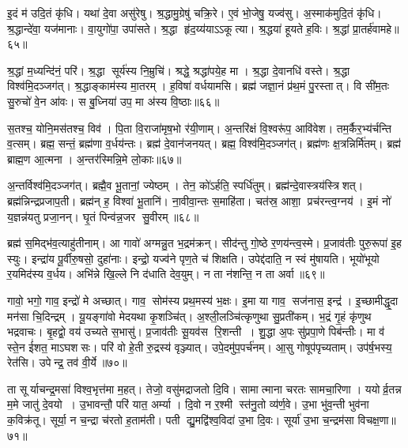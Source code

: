 इ॒दं म॑ उदि॒तं कृ॑धि।
यथा॑ दे॒वा असु॑रेषु।
श्र॒द्धामु॒ग्रेषु॑ चक्रि॒रे।
ए॒वं भो॒जेषु॒ यज्व॑सु।
अ॒स्माक॑मुदि॒तं कृ॑धि।
श्र॒द्धान्दे॑वा॒ यज॑मानाः।
वा॒युगो॑पा॒ उपा॑सते।
श्र॒द्धा हृ॑द॒य्य॑याऽऽकूत्या।
श्र॒द्धया॑ हूयते ह॒विः।
श्र॒द्धां प्रा॒तर्\mbox{}ह॑वामहे॥६५॥

श्र॒द्धां म॒ध्यन्दि॑नं॒ परि॑।
श्र॒द्धा सूर्य॑स्य नि॒म्रुचि॑।
श्रद्धे॒ श्रद्धा॑पये॒ह मा।
श्र॒द्धा दे॒वानधि॑ वस्ते।
श्र॒द्धा विश्व॑मि॒दञ्जग॑त्।
श्र॒द्धाङ्काम॑स्य मा॒तरम्।
ह॒विषा॑ वर्धयामसि।
ब्रह्म॑ जज्ञा॒नं प्र॑थ॒मं पु॒रस्तात्।
वि सी॑म॒तः सु॒रुचो॑ वे॒न आ॑वः।
स बु॒ध्निया॑ उप॒ मा अ॑स्य वि॒ष्ठाः॥६६॥

स॒तश्च॒ योनि॒मस॑तश्च॒ विव॑।
पि॒ता वि॒राजा॑मृष॒भो र॑यी॒णाम्।
अ॒न्तरि॑क्षं वि॒श्वरू॑प॒ आवि॑वेश।
तम॒र्कैर॒भ्य॑र्चन्ति व॒त्सम्।
ब्रह्म॒ सन्तं॒ ब्रह्म॑णा व॒र्धय॑न्तः।
ब्रह्म॑ दे॒वान॑जनयत्।
ब्रह्म॒ विश्व॑मि॒दञ्जग॑त्।
ब्रह्म॑णः क्ष॒त्रन्निर्मि॑तम्।
ब्रह्म॑ ब्राह्म॒ण आ॒त्मना।
अ॒न्तर॑स्मिन्नि॒मे लो॒काः॥६७॥

अ॒न्तर्विश्व॑मि॒दञ्जग॑त्।
ब्रह्मै॒व भू॒तानां॒ ज्येष्ठम्।
तेन॒ को॑ऽर्\mbox{}हति॒ स्पर्धि॑तुम्।
ब्रह्म॑न्दे॒वास्त्रय॑स्त्रिशत्।
ब्रह्म॑न्निन्द्रप्रजाप॒ती।
ब्रह्म॑न् ह॒ विश्वा॑ भू॒तानि॑।
ना॒वीवा॒न्तः स॒माहि॑ता।
चत॑स्र॒ आशा॒ प्रच॑रन्त्व॒ग्नय॑।
इ॒मं नो॑ य॒ज्ञन्न॑यतु प्रजा॒नन्।
घृ॒तं पिन्व॑न्न॒जर सु॒वीरम्॥६८॥

ब्रह्म॑ स॒मिद्भ॑व॒त्याहु॑तीनाम्।
आ गावो॑ अग्मन्नु॒त भ॒द्रम॑क्रन्।
सीद॑न्तु गो॒ष्ठे र॒णय॑न्त्व॒स्मे।
प्र॒जाव॑तीः पुरु॒रूपा॑ इ॒ह स्युः।
इन्द्रा॑य पू॒र्वीरु॒षसो॒ दुहा॑नाः।
इन्द्रो॒ यज्व॑ने पृण॒ते च॑ शिक्षति।
उपेद्द॑दाति॒ न स्वं मु॑षायति।
भूयो॑भूयो र॒यमिद॑स्य व॒र्धय\sn{}।
अभि॑न्ने खि॒ल्ले नि द॑धाति देव॒युम्।
न ता न॑शन्ति॒ न ता अर्वा॥६९॥

गावो॒ भगो॒ गाव॒ इन्द्रो॑ मे अच्छात्।
गाव॒ सोम॑स्य प्रथ॒मस्य॑ भ॒क्षः।
इ॒मा या गाव॒ सज॑नास॒ इन्द्र॑।
इ॒च्छामीद्धृ॒दा मन॑सा चि॒दिन्द्रम्।
यू॒यङ्गा॑वो मेदयथा कृ॒शञ्चि॑त्।
अ॒श्ली॒लञ्चि॑त्कृणुथा सु॒प्रती॑कम्।
भ॒द्रं गृ॒हं कृ॑णुथ भद्रवाचः।
बृ॒हद्वो॒ वय॑ उच्यते स॒भासु॑।
प्र॒जाव॑तीः सू॒यव॑स रि॒शन्ती।
शु॒द्धा अ॒पः सु॑प्रपा॒णे पिब॑न्तीः।
मा व॑ स्ते॒न ई॑शत॒ माऽघशसः।
परि॑ वो हे॒ती रु॒द्रस्य॑ वृञ्ज्यात्।
उपे॒दमु॑प॒पर्च॑नम्।
आ॒सु गोषूप॑पृच्यताम्।
उप॑र्\mbox{}ष॒भस्य॒ रेत॑सि।
उपेन्द्र॒ तव॑ वी॒र्ये॥७०॥\anuvakamend[च॒रा॒मि॒ कनी॑यो॒ऽन्यानर्पि॑ता प॒दानि॒ यज्व॑सु हवामहे वि॒ष्ठा लो॒काः सु॒वीर॒मर्वा॒ पिब॑न्ती॒ष्षट्च॑]

ता सूर्याचन्द्र॒मसा॑ विश्व॒भृत्त॑मा म॒हत्।
तेजो॒ वसु॑मद्राजतो दि॒वि।
सामात्माना चरतः सामचा॒रिणा।
ययोर्व्र॒तन्न म॒मे जातु॑ दे॒वयो।
उ॒भावन्तौ॒ परि॑ यात॒ अर्म्या।
दि॒वो न र॒श्मी स्त॑नु॒तो व्य॑र्ण॒वे।
उ॒भा भु॑व॒न्ती भुव॑ना क॒विक्र॑तू।
सूर्या॒ न च॒न्द्रा च॑रतो ह॒ताम॑ती।
पती द्यु॒मद्वि॑श्व॒विदा॑ उ॒भा दि॒वः।
सूर्या॑ उ॒भा च॒न्द्रम॑सा विचक्ष॒णा॥७१॥

